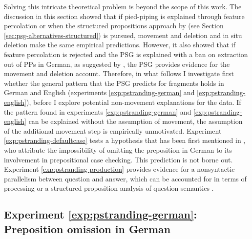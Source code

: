 Solving this intricate theoretical problem is beyond the scope of this work. The discussion in this section showed that if pied-piping is explained through feature percolation or when the structured propositions approach by \citet{reich2002} (see Section \ref{sec:psg-alternatives-structured}) is pursued, movement and deletion and in situ deletion make the same empirical predictions. However, it also showed that if feature percolation is rejected and the PSG is explained with a ban on extraction out of PPs in German, as suggested by \citet{abels2003, abels2012}, the PSG provides evidence for the movement and deletion account. Therefore, in what follows I investigate first whether the general pattern that the PSG predicts for fragments holds in German and English (experiments \ref{exp:pstranding-german} and \ref{exp:pstranding-english}), before I explore potential non-movement explanations for the data. If the pattern found in experiments \ref{exp:pstranding-german} and \ref{exp:pstranding-english} can be explained without the assumption of movement, the assumption of the additional movement step is empirically unmotivated. Experiment \ref{exp:pstranding-defaultcase} tests a hypothesis that has been first mentioned in \citet{barton.progovac2005}, who attribute the impossibility of omitting the preposition in German to its involvement in prepositional case checking. This prediction is not borne out. Experiment \ref{exp:pstranding-production} provides evidence for a nonsyntactic parallelism between question and answer, which can be accounted for in terms of processing \citep{levelt.kelter1982, nykiel2017} or a structured proposition analysis of question semantics \citep{reich2002, reich2007}.


\label{exp:pstranding-german}
\subsection{Experiment \ref{exp:pstranding-german}: Preposition omission in German} 
\label{sec:pstranding-german}

